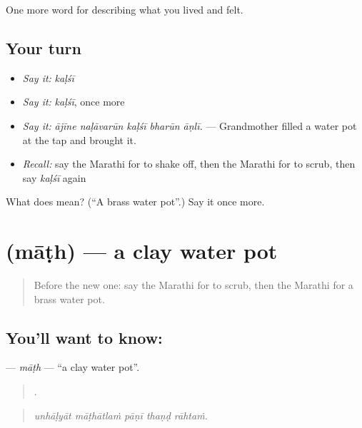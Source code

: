 \begin{grammarlens}[title={What you've built}]
One more word for describing what you lived and felt.
\end{grammarlens}

\subsection*{Your turn}
\begin{itemize}
\raggedright
  \item \emph{Say it:} \emph{kaḷśī}
  \item \emph{Say it:} \emph{kaḷśī}, once more
  \item \emph{Say it:} \emph{ājīne naḷāvarūn kaḷśī bharūn āṇlī.} — Grandmother filled a water pot at the tap and brought it.
  \item \emph{Recall:} say the Marathi for to shake off, then the Marathi for to scrub, then say \emph{kaḷśī} again
\end{itemize}

\begin{tcolorbox}[breakable,colback=teal!4,colframe=teal!35!black,title={Before you move on}]
What does  mean? (\textquotedblleft{}A brass water pot\textquotedblright{}.) Say it once more.
\end{tcolorbox}
\section[\texorpdfstring{\mr{माठ} (māṭh)}{माठ (māṭh)}]{ (māṭh) — a clay water pot}

\label{lesson:MR-C525-math}



\begin{quote}
Before the new one: say the Marathi for to scrub, then the Marathi for a brass water pot.
\end{quote}

\subsection*{You'll want to know: }
\textbf{} — \emph{māṭh} — \textquotedblleft{}a clay water pot\textquotedblright{}.

\begin{quote}
    .
\end{quote}

\begin{quote}
\emph{unhāḷyāt māṭhātlaṁ pāṇī thaṇḍ rāhtaṁ.}
\end{quote}

